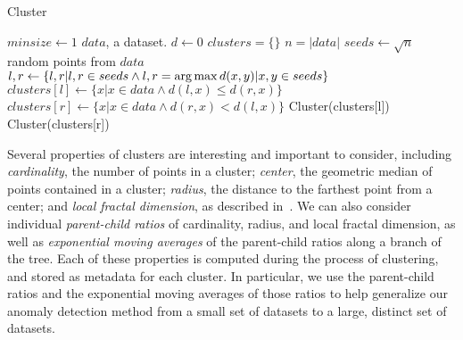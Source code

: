 \begin{algorithm} %
\caption{Cluster} %
\label{alg:clam} %
\begin{algorithmic}[1] %
\STATE $minsize \leftarrow 1$
\STATE $data$, a dataset.
\STATE $d \gets 0$
\STATE $clusters = \{\}$
\STATE $n = |data|$
    \STATE $seeds \leftarrow \sqrt{n}$ random points from $data$
    \STATE $l, r \gets \{l, r | l,r \in seeds \land l,r = \operatorname*{arg\,max} d(x,y) | x,y \in seeds\}$
    \STATE $clusters[l] \gets \{x | x \in data \land d(l,x) \le d(r,x)\}$
    \STATE $clusters[r] \gets \{x | x \in data \land d(r,x) < d(l,x)\}$
        \STATE Cluster(clusters[l])
    \ENDIF
        \STATE Cluster(clusters[r])
    \ENDIF
\ENDWHILE
\end{algorithmic}
\end{algorithm}

Several properties of clusters are interesting and important to consider, including \textit{cardinality}, the number of points in a cluster; \textit{center}, the geometric median of points contained in a cluster; \textit{radius}, the distance to the farthest point from a center; and \textit{local fractal dimension}, as described in~\cite{ishaq2019clustered}.
We can also consider individual \textit{parent-child ratios} of cardinality, radius, and local fractal dimension, as well as \textit{exponential moving averages} of the parent-child ratios along a branch of the tree.
Each of these properties is computed during the process of clustering, and stored as metadata for each cluster.
In particular, we use the parent-child ratios and the exponential moving averages of those ratios to help generalize our anomaly detection method from a small set of datasets to a large, distinct set of datasets.

